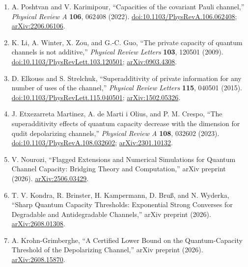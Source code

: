 \begin{enumerate}[label={},leftmargin=4.8em,labelsep=0.5em]
  \item[\textup{[PK22]}]\label{ref:pd-poshtvan-karimipour}
  A. Poshtvan and V. Karimipour, ``Capacities of the covariant Pauli
  channel,'' \emph{Physical Review A} \textbf{106}, 062408 (2022).
  \href{https://doi.org/10.1103/PhysRevA.106.062408}{doi:10.1103/PhysRevA.106.062408};
  \href{https://arxiv.org/abs/2206.06106}{arXiv:2206.06106}.

  \item[\textup{[LWZG09]}]\label{ref:pd-li-winter-zou-guo}
  K. Li, A. Winter, X. Zou, and G.-C. Guo, ``The private capacity of
  quantum channels is not additive,'' \emph{Physical Review Letters}
  \textbf{103}, 120501 (2009).
  \href{https://doi.org/10.1103/PhysRevLett.103.120501}{doi:10.1103/PhysRevLett.103.120501};
  \href{https://arxiv.org/abs/0903.4308}{arXiv:0903.4308}.

  \item[\textup{[ES15]}]\label{ref:pd-elkouss-strelchuk}
  D. Elkouss and S. Strelchuk, ``Superadditivity of private information
  for any number of uses of the channel,'' \emph{Physical Review Letters}
  \textbf{115}, 040501 (2015).
  \href{https://doi.org/10.1103/PhysRevLett.115.040501}{doi:10.1103/PhysRevLett.115.040501};
  \href{https://arxiv.org/abs/1502.05326}{arXiv:1502.05326}.

  \item[\textup{[EMC+23]}]\label{ref:pd-etxezarreta-martinez}
  J. Etxezarreta Martinez, A. de Marti i Olius, and P. M. Crespo,
  ``The superadditivity effects of quantum capacity decrease with
  the dimension for qudit depolarizing channels,'' \emph{Physical Review A}
  \textbf{108}, 032602 (2023).
  \href{https://doi.org/10.1103/PhysRevA.108.032602}{doi:10.1103/PhysRevA.108.032602};
  \href{https://arxiv.org/abs/2301.10132}{arXiv:2301.10132}.

  \item[\textup{[Nour26]}]\label{ref:pd-nourozi}
  V. Nourozi, ``Flagged Extensions and Numerical Simulations for Quantum
  Channel Capacity: Bridging Theory and Computation,'' arXiv preprint
  (2026).
  \href{https://arxiv.org/abs/2506.03429}{arXiv:2506.03429}.

  \item[\textup{[KBK+26]}]\label{ref:pd-kondra-et-al}
  T. V. Kondra, R. Brinster, H. Kampermann, D. Bru{\ss}, and N. Wyderka,
  ``Sharp Quantum Capacity Thresholds: Exponential Strong Converses for
  Degradable and Antidegradable Channels,'' arXiv preprint (2026).
  \href{https://arxiv.org/abs/2608.01308}{arXiv:2608.01308}.

  \item[\textup{[KG26]}]\label{ref:pd-krohn-grimberghe}
  A. Krohn-Grimberghe, ``A Certified Lower Bound on the Quantum-Capacity
  Threshold of the Depolarizing Channel,'' arXiv preprint (2026).
  \href{https://arxiv.org/abs/2608.15870}{arXiv:2608.15870}.
\end{enumerate}

